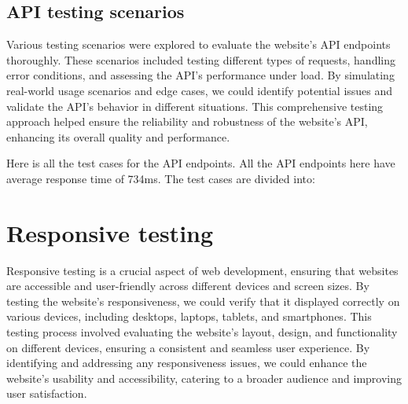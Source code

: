 \subsection{API testing scenarios}
Various testing scenarios were explored to evaluate the website's API
endpoints thoroughly. These scenarios included testing different types of
requests, handling error conditions, and assessing the API's performance
under load. By simulating real-world usage scenarios and edge cases, we
could identify potential issues and validate the API's behavior in
different situations. This comprehensive testing approach helped ensure
the reliability and robustness of the website's API, enhancing its overall
quality and performance. 

Here is all the test cases for the API endpoints. All the API endpoints
here have average response time of 734ms. The test cases are divided into:






















\section{Responsive testing}
Responsive testing is a crucial aspect of web development, ensuring that
websites are accessible and user-friendly across different devices and
screen sizes. By testing the website's responsiveness, we could verify
that it displayed correctly on various devices, including desktops,
laptops, tablets, and smartphones. This testing process involved
evaluating the website's layout, design, and functionality on different
devices, ensuring a consistent and seamless user experience. By
identifying and addressing any responsiveness issues, we could enhance
the website's usability and accessibility, catering to a broader audience
and improving user satisfaction.



